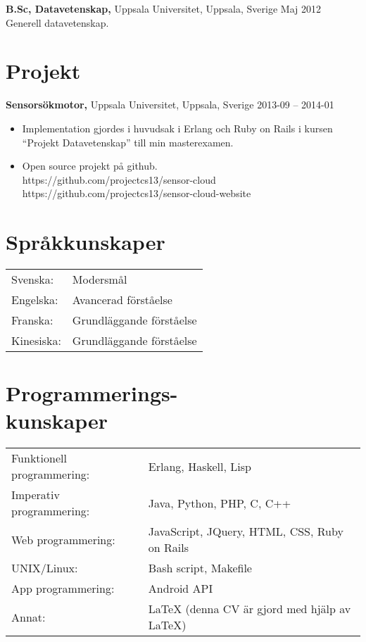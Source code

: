 \documentclass[margin]{res}
\begin{document}
\begin{resume}
{\bf B.Sc, Datavetenskap,} Uppsala Universitet, Uppsala, Sverige \hfill Maj 2012 \\
Generell datavetenskap.

\newpage
\section{Projekt}
{\bf Sensorsökmotor,} Uppsala Universitet, Uppsala, Sverige \hfill 2013-09 -- 2014-01
 \begin{itemize} \itemsep -2pt  %
 \item Implementation gjordes i huvudsak i Erlang och Ruby on Rails i
   kursen ``Projekt Datavetenskap'' till min masterexamen.
 \item Open source projekt på github. \\
 https://github.com/projectcs13/sensor-cloud\\
 https://github.com/projectcs13/sensor-cloud-website
 \end{itemize}


\section{Språkkunskaper}
   \begin{tabular}{l p{3in}}
    Svenska:  & Modersmål \\
    Engelska: & Avancerad förståelse  \\
    Franska:  & Grundläggande förståelse \\
    Kinesiska:& Grundläggande förståelse
 \end{tabular}

\section{Programmerings- \\ kunskaper}
   \begin{tabular}{l p{3in}}
    Funktionell programmering: & Erlang, Haskell, Lisp \\
    Imperativ programmering: & Java, Python, PHP, C, C++ \\
    Web programmering: & JavaScript, JQuery, HTML, CSS, Ruby on Rails \\
    UNIX/Linux: & Bash script, Makefile \\
    App programmering: & Android API \\
    Annat: & LaTeX (denna CV är gjord med hjälp av LaTeX)
 \end{tabular}


\end{resume}
\end{document}
